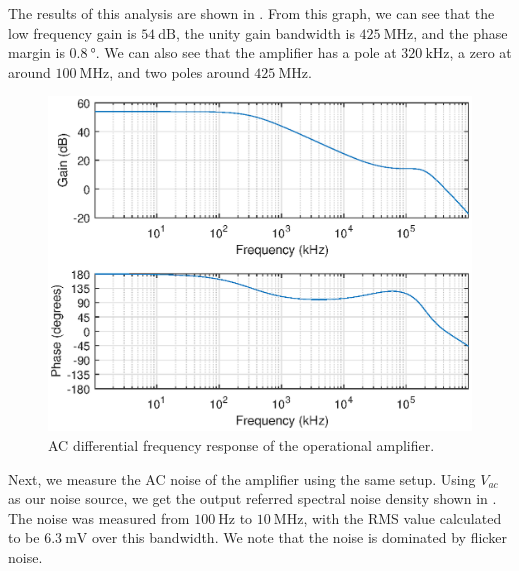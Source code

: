 \documentclass[journal,hidelinks]{IEEEtran}
\begin{document}
The results of this analysis are shown in . From this graph, we can see that the low frequency gain is $\SI{54}{\deci\bel}$, the unity gain bandwidth is $\SI{425}{\mega\hertz}$, and the phase margin is $\SI{0.8}{\degree}$. We can also see that the amplifier has a pole at $\SI{320}{\kilo\hertz}$, a zero at around $\SI{100}{\mega\hertz}$, and two poles around $\SI{425}{\mega\hertz}$.

\begin{figure}[!htb]
  \centering
  \includegraphics[width=\columnwidth]{ac_dm.eps}
  \caption{AC differential frequency response of the operational amplifier.}
  \label{fig:ac_dm}
\end{figure}

Next, we measure the AC noise of the amplifier using the same setup. Using $V_{ac}$ as our noise source, we get the output referred spectral noise density shown in . The noise was measured from $\SI{100}{\hertz}$ to $\SI{10}{\mega\hertz}$, with the RMS value calculated to be $\SI{6.3}{\milli\volt}$ over this bandwidth. We note that the noise is dominated by flicker noise.
\end{document}
